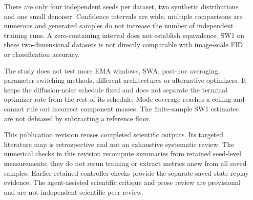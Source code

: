 There are only four independent seeds per dataset, two synthetic
distributions and one small denoiser. Confidence intervals are wide,
multiple comparisons are numerous and generated samples do not increase
the number of independent training runs. A zero-containing interval does
not establish equivalence. SW1 on these two-dimensional datasets is not
directly comparable with image-scale FID or classification accuracy.

The study does not test more EMA windows, SWA, post-hoc averaging,
parameter-switching methods, different architectures or alternative
optimizers. It keeps the diffusion-noise schedule fixed and does not
separate the terminal optimizer rate from the rest of its schedule. Mode
coverage reaches a ceiling and cannot rule out incorrect component masses.
The finite-sample SW1 estimates are not debiased by subtracting a reference
floor.

This publication revision reuses completed scientific outputs. Its
targeted literature map is retrospective and not an exhaustive systematic
review. The numerical checks in this revision recompute summaries from
retained seed-level measurements; they do not rerun training or extract
metrics anew from all saved samples. Earlier retained controller checks
provide the separate saved-state replay evidence. The agent-assisted
scientific critique and prose review are provisional and are not independent
scientific peer review.
